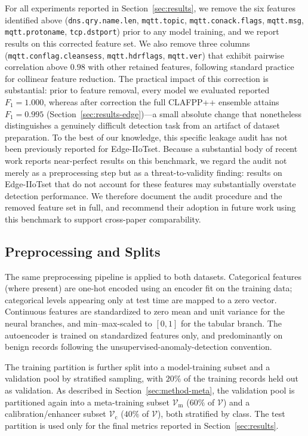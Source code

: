 \documentclass[pdflatex,sn-mathphys-num]{sn-jnl}
\theoremstyle{thmstyleone}
\theoremstyle{thmstyletwo}
\theoremstyle{thmstylethree}
\begin{document}
For all experiments reported in Section~\ref{sec:results}, we remove the six features identified above (\texttt{dns.qry.name.len}, \texttt{mqtt.topic}, \texttt{mqtt.conack.flags}, \texttt{mqtt.msg}, \texttt{mqtt.protoname}, \texttt{tcp.dstport}) prior to any model training, and we report results on this corrected feature set. We also remove three columns (\texttt{mqtt.conflag.cleansess}, \texttt{mqtt.hdrflags}, \texttt{mqtt.ver}) that exhibit pairwise correlation above $0.98$ with other retained features, following standard practice for collinear feature reduction. The practical impact of this correction is substantial: prior to feature removal, every model we evaluated reported $F_1 = 1.000$, whereas after correction the full CLAFPP++ ensemble attains $F_1 = 0.995$ (Section~\ref{sec:results-edge})---a small absolute change that nonetheless distinguishes a genuinely difficult detection task from an artifact of dataset preparation. To the best of our knowledge, this specific leakage audit has not been previously reported for Edge-IIoTset. Because a substantial body of recent work reports near-perfect results on this benchmark, we regard the audit not merely as a preprocessing step but as a threat-to-validity finding: results on Edge-IIoTset that do not account for these features may substantially overstate detection performance. We therefore document the audit procedure and the removed feature set in full, and recommend their adoption in future work using this benchmark to support cross-paper comparability.

\subsection{Preprocessing and Splits}\label{sec:setup-preprocessing}

The same preprocessing pipeline is applied to both datasets. Categorical features (where present) are one-hot encoded using an encoder fit on the training data; categorical levels appearing only at test time are mapped to a zero vector. Continuous features are standardized to zero mean and unit variance for the neural branches, and min--max-scaled to $[0,1]$ for the tabular branch. The autoencoder is trained on standardized features only, and predominantly on benign records following the unsupervised-anomaly-detection convention.

The training partition is further split into a model-training subset and a validation pool by stratified sampling, with $20\%$ of the training records held out as validation. As described in Section~\ref{sec:method-meta}, the validation pool is partitioned again into a meta-training subset $\mathcal{V}_{\mathrm{m}}$ ($60\%$ of $\mathcal{V}$) and a calibration/enhancer subset $\mathcal{V}_{\mathrm{c}}$ ($40\%$ of $\mathcal{V}$), both stratified by class. The test partition is used only for the final metrics reported in Section~\ref{sec:results}.
\end{document}
